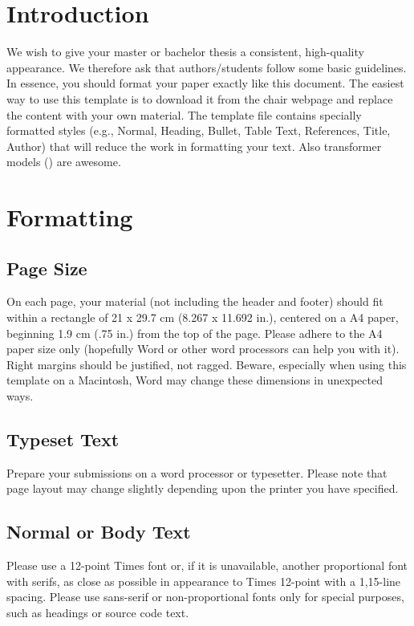 \documentclass[11pt]{article}
\begin{document}
\tableofcontents

\newpage


\section{Introduction}
We wish to give your master or bachelor thesis a consistent, high-quality appearance. We therefore ask that authors/students follow some basic guidelines. In essence, you should format your paper exactly like this document. The easiest way to use this template is to download it from the chair webpage and replace the content with your own material. The template file contains specially formatted styles (e.g., Normal, Heading, Bullet, Table Text, References, Title, Author) that will reduce the work in formatting your text.
Also transformer models (\cite{attentionIsAllYouNeed}) are awesome.

\section{Formatting}
\subsection{Page Size}
On each page, your material (not including the header and footer) should fit within a rectangle of 21 x 29.7 cm (8.267 x 11.692 in.), centered on a A4 paper, beginning 1.9 cm (.75 in.) from the top of the page. Please adhere to the A4 paper size only (hopefully Word or other word processors can help you with it). Right margins should be justified, not ragged. Beware, especially when using this template on a Macintosh, Word may change these dimensions in unexpected ways.

\subsection{Typeset Text}
Prepare your submissions on a word processor or typesetter. Please note that page layout may change slightly depending upon the printer you have specified.

\subsection{Normal or Body Text}
Please use a 12-point Times font or, if it is unavailable, another proportional font with serifs, as close as possible in appearance to Times 12-point with a 1,15-line spacing. Please use sans-serif or non-proportional fonts only for special purposes, such as headings or source code text.
\end{document}
